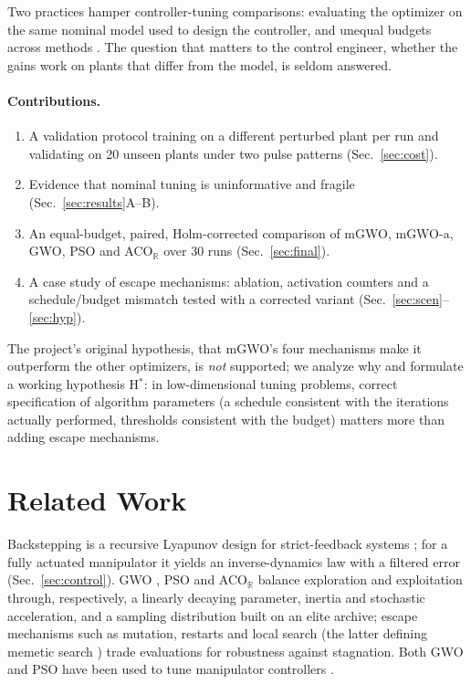 \documentclass[10pt,journal,compsoc]{IEEEtran}
\newcommand{\mgwo}{mGWO}
\newcommand{\mgwoa}{mGWO-a}
\newcommand{\acor}{ACO$_\mathbb{R}$}
\begin{document}
Two practices hamper controller-tuning comparisons: evaluating the optimizer on the same nominal model used to design the controller, and unequal budgets across methods \cite{sorensen2015,camacho2023,kononova2014,kudela2022}. The question that matters to the control engineer, whether the gains work on plants that differ from the model, is seldom answered.

\paragraph{Contributions.}
\begin{enumerate}
\item A validation protocol training on a different perturbed plant per run and validating on 20 unseen plants under two pulse patterns (Sec.~\ref{sec:cost}).
\item Evidence that nominal tuning is uninformative and fragile (Sec.~\ref{sec:results}A--B).
\item An equal-budget, paired, Holm-corrected comparison of \mgwo{}, \mgwoa{}, GWO, PSO and \acor{} over 30 runs (Sec.~\ref{sec:final}).
\item A case study of escape mechanisms: ablation, activation counters and a schedule/budget mismatch tested with a corrected variant (Sec.~\ref{sec:scen}--\ref{sec:hyp}).
\end{enumerate}
The project's original hypothesis, that \mgwo{}'s four mechanisms make it outperform the other optimizers, is \emph{not} supported; we analyze why and formulate a working hypothesis H$^\ast$: in low-dimensional tuning problems, correct specification of algorithm parameters (a schedule consistent with the iterations actually performed, thresholds consistent with the budget) matters more than adding escape mechanisms.

\section{Related Work}
Backstepping is a recursive Lyapunov design for strict-feedback systems \cite{krstic1995,khalil2002}; for a fully actuated manipulator it yields an inverse-dynamics law with a filtered error (Sec.~\ref{sec:control}). GWO \cite{mirjalili2014}, PSO \cite{kennedy1995,shi1998,clerc2002} and \acor{} \cite{socha2008,dorigo1997} balance exploration and exploitation \cite{crepinsek2013} through, respectively, a linearly decaying parameter, inertia and stochastic acceleration, and a sampling distribution built on an elite archive; escape mechanisms such as mutation, restarts and local search (the latter defining memetic search \cite{neri2012,blum2003}) trade evaluations for robustness against stagnation. Both GWO and PSO have been used to tune manipulator controllers \cite{azeez2023,dai2023}.
\end{document}
